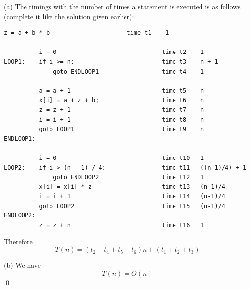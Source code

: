 
(a) The timings with the number of times a statement is executed
is as follows (complete it like the solution given earlier):
\begin{Verbatim}[frame=single]
          z = a + b * b                      time t1    1

          i = 0                              time t2    1
LOOP1:    if i >= n:                         time t3    n + 1
              goto ENDLOOP1                  time t4    1
 
          a = a + 1                          time t5    n
          x[i] = a + z + b;                  time t6    n
          z = z + 1                          time t7    n
          i = i + 1                          time t8    n
          goto LOOP1                         time t9    n
ENDLOOP1:

          i = 0                              time t10   1
LOOP2:    if i > (n - 1) / 4:                time t11   ((n-1)/4) + 1
              goto ENDLOOP2                  time t12   1
          x[i] = x[i] * z                    time t13   (n-1)/4
          i = i + 1                          time t14   (n-1)/4
          goto LOOP2                         time t15   (n-1)/4
ENDLOOP2:
          z = z + n                          time t16   1
\end{Verbatim}

Therefore
\[
T(n) = (t_2 + t_4 + t_5 + t_6)n + (t_1 + t_2 + t_3)
\]

(b)
We have
\[
T(n) = O(n)
\]
\qed


